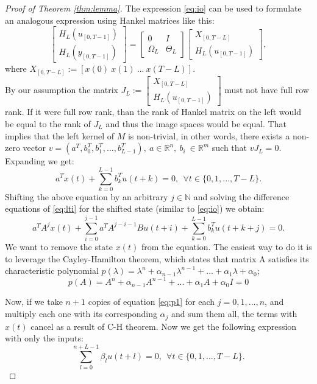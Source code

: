 \documentclass[12pt,a4paper]{report}
\begin{document}
\begin{proof}[Proof of Theorem \ref{thm:lemma}]
    The expression \eqref{eq:io} can be used to formulate an analogous expression using Hankel matrices like this:
    \[\begin{bmatrix} H_{L}(u_{[0, T-1]}) \\ H_{L}(y_{[0, T-1]}) \end{bmatrix} = \begin{bmatrix}0 & I \\ \Omega_L & \Theta_L \end{bmatrix} \begin{bmatrix} X_{[0, T-L]} \\ H_{L}(u_{[0, T-1]})\end{bmatrix}, \]
    where \(X_{[0, T-L]} := [x(0) \ x(1) \ ... \ x(T-L)]\). \\ 
    By our assumption the matrix \(J_L := \begin{bmatrix} X_{[0, T-L]} \\ H_{L}(u_{[0, T-1]})\end{bmatrix}\) must not have full row rank. If it were full row rank, than the rank of Hankel matrix on the left would be
    equal to the rank of $J_L$ and thus the image spaces would be equal. That implies that the left kernel of $M$ is non-trivial, in other words,
    there exists a non-zero vector \(v = (a^T, b_{0}^T, b_{1}^T, ... , b_{L-1}^T), \ a\in\mathbb{R}^n, \ b_{i} \ \in\mathbb{R}^{m}\) such that \(vJ_L = 0\). Expanding we get:
    \begin{equation}a^{T}x(t) + \sum_{k=0}^{L-1}b_{k}^Tu(t+k) = 0, \ \ \forall t \in \{0, 1, ..., T-L\}. \label{eq:p0}\end{equation} Shifting the above equation by an arbitrary $j\in\mathbb{N}$ and solving the difference equations of \eqref{eq:lti} for the shifted state
    (similar to \eqref{eq:io}) we obtain:
    \begin{equation}
        a^{T}A^{j}x(t) +  \sum_{i=0}^{j-1}a^{T}A^{j-i-1}Bu(t+i) + \sum_{k=0}^{L-1}b_{k}^{T}u(t+k+j) = 0.
        \label{eq:p1}
    \end{equation}
    We want to remove the state $x(t)$ from the equation. The easiest way to do it is to leverage the Cayley-Hamilton theorem, which states that matrix A satisfies its characteristic polynomial
    \(p(\lambda) = \lambda^n + \alpha_{n-1}\lambda^{n-1} + ... + \alpha_1\lambda + \alpha_0\);
    \[p(A) = A^n + \alpha_{n-1}A^{n-1} + ... + \alpha_1A + \alpha_0I = 0 \]

    Now, if we take $n+1$ copies of equation \eqref{eq:p1} for each $j = 0, 1, ..., n$, and multiply each one with its corresponding $\alpha_j$ and sum them all, the terms with $x(t)$ cancel
    as a result of C-H theorem. Now we get the following expression with only the inputs:
    \begin{equation}
        \sum_{l=0}^{n+L-1}\beta_{l}u(t+l) = 0, \ \ \forall t \in \{0, 1, ..., T-L\}.
        \label{eq:beta}
    \end{equation}


\end{proof}
\end{document}

